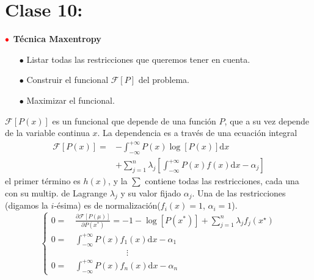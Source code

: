 \documentclass[%
 reprint,
 amsmath,amssymb,
 aps,
]{revtex4-1}
\begin{document}

\section{Clase 10:}

\textbf{$\color{red}{\bullet}$ Técnica Maxentropy}

\begin{itemize}
  \item[$\bullet$] Listar todas las restricciones que queremos tener en cuenta.
  \item[$\bullet$] Construir el funcional $\mathcal{F}[P]$ del problema.
  \item[$\bullet$] Maximizar el funcional.
\end{itemize}

$\mathcal{F}[P(x)]$ es un funcional que depende de una función $P$, que a su vez depende de la variable
continua $x$. La dependencia es a través de una ecuación integral
$$
\begin{aligned}
  \mathcal{F}[P(x)]=&-\int_{-\infty}^{+\infty} P(x) \log [P(x)] \mathrm{d} x\\
  &+\sum_{j=1}^{n} \lambda_{j}\left[\int_{-\infty}^{+\infty} P(x) f(x) \mathrm{d} x-\alpha_{j}\right]
\end{aligned}
$$
el primer término es $h(x)$, y la $\sum$ contiene todas las restricciones, cada una con su multip. de Lagrange $\lambda_{j}$ y su valor fijado $\alpha_{j}$. Una de las restricciones (digamos la $i$-ésima) es de normalización($f_{i}(x)=1$, $\alpha_{i}=1$). 
$$ \left\lbrace
\begin{aligned}
  0 =& \frac{\partial \mathcal{F}[P(\mu)]}{\partial P\left(x^{*}\right)}=-1-\log \left[P\left(x^{*}\right)\right]+\sum_{j=1}^{n} \lambda_{j} f_{j}\left(x^{\star}\right) \\
  0 =& \int_{-\infty}^{+\infty} P(x) f_1(x) \mathrm{d} x-\alpha_{1} \\
  \qquad & \qquad \qquad \qquad \vdots \\
  0 =& \int_{-\infty}^{+\infty} P(x) f_n(x) \mathrm{d} x-\alpha_{n}
\end{aligned}
\right.
$$
\end{document}
